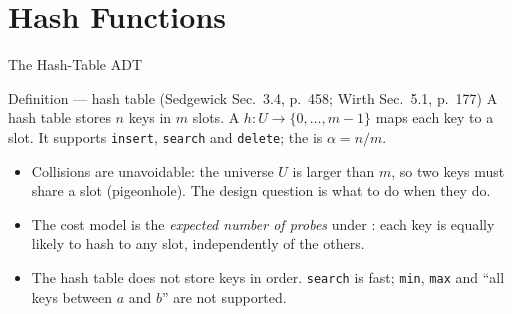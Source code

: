 \documentclass[aspectratio=169]{beamer}
\begin{document}

\section{Hash Functions}


\begin{frame}{The Hash-Table ADT}
  \begin{block}{Definition --- hash table (Sedgewick Sec.~3.4, p.~458;
    Wirth Sec.~5.1, p.~177)}
    A hash table stores $n$ keys in $m$ slots. A 
    $h: U \to \{0,\dots,m-1\}$ maps each key to a slot. It supports
    \texttt{insert}, \texttt{search} and \texttt{delete}; the
     is $\alpha = n/m$.
  \end{block}
  \begin{itemize}
    \item Collisions are unavoidable: the universe $U$ is larger than $m$, so
      two keys must share a slot (pigeonhole). The design question is what to
      do when they do.
    \item The cost model is the \emph{expected number of probes} under
      : each key is equally likely to hash to any slot,
      independently of the others.
    \item The hash table does not store keys in order. \texttt{search} is
      fast; \texttt{min}, \texttt{max} and ``all keys between $a$ and $b$''
      are not supported.
  \end{itemize}
\end{frame}
\end{document}
